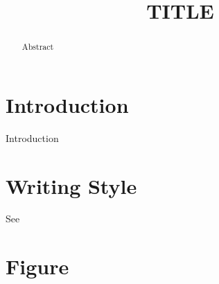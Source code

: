 \documentclass[letterpaper, 10 pt, conference]{ieeeconf}  %
\title{\LARGE \bf TITLE}
\author{\authorblockN{FirstName LastName}
\authorblockA{
INSTITUTION,\\
ADDRESS\\
E-mail: E-MAIL}
}
\begin{document}
\maketitle
\thispagestyle{empty}
\pagestyle{empty}



\begin{abstract}
Abstract
\end{abstract}


\section{Introduction}
Introduction


\section{Writing Style}
See \cite{StanfordStyleGuide,RaibertStyleGuide}

\section{Figure}
\end{document}
